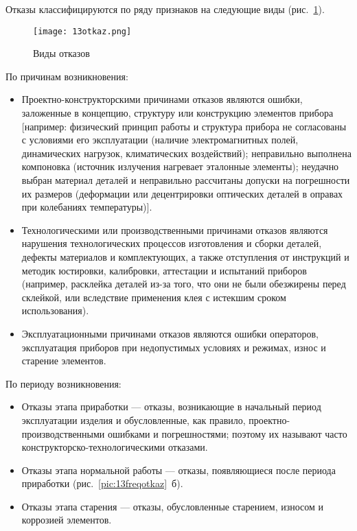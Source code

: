 Отказы классифицируются по ряду признаков на следующие виды (рис.~\ref{pic:13otkaz}).

\begin{figure}[h!]
	\caption{ Виды отказов }
	\texttt{[image: 13otkaz.png]}
	\label{pic:13otkaz}
\end{figure}

По причинам возникновения: 
\begin{itemize}
\item Проектно-конструкторскими причинами отказов являются ошибки, заложенные в концепцию, структуру или конструкцию элементов прибора [например: физический принцип работы и структура прибора не согласованы с условиями его эксплуатации (наличие электромагнитных полей, динамических нагрузок, климатических воздействий); неправильно выполнена компоновка (источник излучения нагревает эталонные элементы); неудачно выбран материал деталей и неправильно рассчитаны допуски на погрешности их размеров (деформации или децентрировки оптических деталей в оправах при колебаниях температуры)].
\item Технологическими или производственными причинами отказов являются нарушения технологических процессов изготовления и сборки деталей, дефекты материалов и комплектующих, а также отступления от инструкций и методик юстировки, калибровки, аттестации и испытаний приборов (например, расклейка деталей из-за того, что они не были обезжирены перед склейкой, или вследствие применения клея с истекшим сроком использования).
\item Эксплуатационными причинами отказов являются ошибки операторов, эксплуатация приборов при недопустимых условиях и режимах, износ и старение элементов.
\end{itemize}

По периоду возникновения:
\begin{itemize}
\item Отказы этапа приработки --- отказы, возникающие в начальный период эксплуатации изделия и обусловленные, как правило, проектно-производственными ошибками и погрешностями; поэтому их называют часто конструкторско-технологическими отказами.
\item Отказы этапа нормальной работы --- отказы, появляющиеся после периода приработки (рис.~\ref{pic:13freqotkaz}~б).
\item Отказы этапа старения --- отказы, обусловленные старением, износом и коррозией элементов.
\end{itemize}

